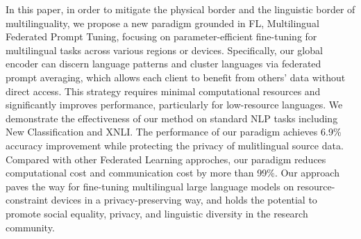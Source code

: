 \documentclass[withindex,glossary]{cam-thesis}
\begin{document}
In this paper, in order to mitigate the physical border and the linguistic border of multilinguality, we propose a new paradigm grounded in FL, Multilingual Federated Prompt Tuning, focusing on parameter-efficient fine-tuning for multilingual tasks across various regions or devices. Specifically, our global encoder can discern language patterns and cluster languages via federated prompt averaging, which allows each client to benefit from others' data without direct access. This strategy requires minimal computational resources and significantly improves performance, particularly for low-resource languages. We demonstrate the effectiveness of our method on standard NLP tasks including New Classification and XNLI. The performance of our paradigm achieves 6.9\% accuracy improvement while protecting the privacy of mulitlingual source data. Compared with other Federated Learning approches, our paradigm reduces computational cost and communication cost by more than 99\%. Our approach paves the way for fine-tuning multilingual large language models on resource-constraint devices in a privacy-preserving way, and holds the potential to promote social equality, privacy, and linguistic diversity in the research community.
\end{document}
